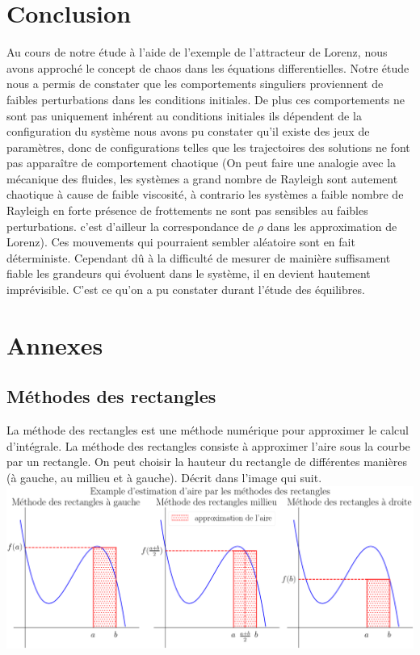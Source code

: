 \documentclass{article}
\newtheorem[M , nocut]{prop}{Proposition}[section]
\newtheorem[M , nocut]{definition}{Définition}
\newtheorem[M , nocut]{lemme}{Lemme}
\newtheorem[L , nocut]{thm}{Théoreme}
\newtheorem[M , nocut]{cor}{Corollaire}
\begin{document}
\newpage
\section{Conclusion}

Au cours de notre étude à l'aide de l'exemple de l'attracteur de Lorenz, nous avons approché le concept de chaos dans les équations differentielles. Notre étude nous a permis de constater que les comportements singuliers proviennent de faibles perturbations dans les conditions initiales. De plus ces comportements ne sont pas uniquement inhérent au conditions initiales ils dépendent de la configuration du système nous avons pu constater qu'il existe des jeux de paramètres, donc de configurations telles que les trajectoires des solutions ne font pas apparaître de comportement chaotique (On peut faire une analogie avec la mécanique des fluides, les systèmes a grand nombre de Rayleigh sont autement chaotique à cause de faible viscosité, à contrario les systèmes a faible nombre de Rayleigh en forte présence de frottements ne sont pas sensibles au faibles perturbations. c'est d'ailleur la correspondance de $\rho$ dans les approximation de Lorenz). Ces mouvements qui pourraient sembler aléatoire sont en fait déterministe. Cependant dû à la difficulté de mesurer de mainière suffisament fiable les grandeurs qui évoluent dans le système, il en devient hautement imprévisible. C'est ce qu'on a pu constater durant l'étude des équilibres.

\newpage
\section{Annexes}
\subsection*{Méthodes des rectangles}
La méthode des rectangles est une méthode numérique pour approximer le calcul d'intégrale. La méthode des rectangles consiste à approximer l'aire sous la courbe par un rectangle. On peut choisir la hauteur du rectangle de différentes manières (à gauche, au millieu et à gauche). Décrit dans l'image qui suit.
\includegraphics[width=\textwidth]{MethodeRect}
\end{document}
